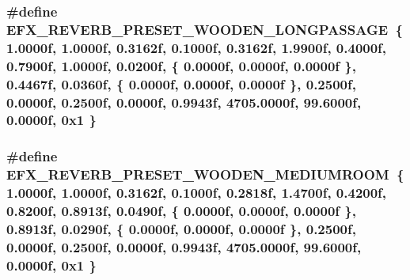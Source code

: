 \subsubsection[{\texorpdfstring{E\+F\+X\+\_\+\+R\+E\+V\+E\+R\+B\+\_\+\+P\+R\+E\+S\+E\+T\+\_\+\+W\+O\+O\+D\+E\+N\+\_\+\+L\+O\+N\+G\+P\+A\+S\+S\+A\+GE}{EFX_REVERB_PRESET_WOODEN_LONGPASSAGE}}]{\setlength{\rightskip}{0pt plus 5cm}\#define E\+F\+X\+\_\+\+R\+E\+V\+E\+R\+B\+\_\+\+P\+R\+E\+S\+E\+T\+\_\+\+W\+O\+O\+D\+E\+N\+\_\+\+L\+O\+N\+G\+P\+A\+S\+S\+A\+GE~\{ 1.\+0000f, 1.\+0000f, 0.\+3162f, 0.\+1000f, 0.\+3162f, 1.\+9900f, 0.\+4000f, 0.\+7900f, 1.\+0000f, 0.\+0200f, \{ 0.\+0000f, 0.\+0000f, 0.\+0000f \}, 0.\+4467f, 0.\+0360f, \{ 0.\+0000f, 0.\+0000f, 0.\+0000f \}, 0.\+2500f, 0.\+0000f, 0.\+2500f, 0.\+0000f, 0.\+9943f, 4705.\+0000f, 99.\+6000f, 0.\+0000f, 0x1 \}}\hypertarget{efx-presets_8h_a18f21a9772e28cbc29f02cd7e52acff0}{}\label{efx-presets_8h_a18f21a9772e28cbc29f02cd7e52acff0}
\subsubsection[{\texorpdfstring{E\+F\+X\+\_\+\+R\+E\+V\+E\+R\+B\+\_\+\+P\+R\+E\+S\+E\+T\+\_\+\+W\+O\+O\+D\+E\+N\+\_\+\+M\+E\+D\+I\+U\+M\+R\+O\+OM}{EFX_REVERB_PRESET_WOODEN_MEDIUMROOM}}]{\setlength{\rightskip}{0pt plus 5cm}\#define E\+F\+X\+\_\+\+R\+E\+V\+E\+R\+B\+\_\+\+P\+R\+E\+S\+E\+T\+\_\+\+W\+O\+O\+D\+E\+N\+\_\+\+M\+E\+D\+I\+U\+M\+R\+O\+OM~\{ 1.\+0000f, 1.\+0000f, 0.\+3162f, 0.\+1000f, 0.\+2818f, 1.\+4700f, 0.\+4200f, 0.\+8200f, 0.\+8913f, 0.\+0490f, \{ 0.\+0000f, 0.\+0000f, 0.\+0000f \}, 0.\+8913f, 0.\+0290f, \{ 0.\+0000f, 0.\+0000f, 0.\+0000f \}, 0.\+2500f, 0.\+0000f, 0.\+2500f, 0.\+0000f, 0.\+9943f, 4705.\+0000f, 99.\+6000f, 0.\+0000f, 0x1 \}}\hypertarget{efx-presets_8h_a0e3f257cb084f192323997f347262c64}{}\label{efx-presets_8h_a0e3f257cb084f192323997f347262c64}
